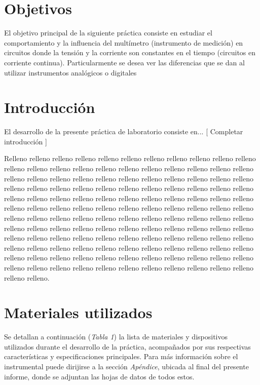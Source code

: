 \documentclass{article}
\begin{document}
\section{Objetivos}

	El objetivo principal de la siguiente práctica consiste en estudiar el comportamiento y la influencia del multímetro (instrumento de medición) en circuitos donde la tensión y la corriente son constantes en el tiempo (circuitos en corriente continua). Particularmente se desea ver las diferencias que se dan al utilizar instrumentos analógicos o digitales




\section{Introducción}

	El desarrollo de la presente práctica de laboratorio consiste en... [ Completar introducción ]
	\par
	Relleno relleno relleno relleno relleno relleno relleno relleno relleno relleno relleno relleno relleno relleno relleno relleno relleno relleno relleno relleno relleno relleno relleno relleno relleno relleno relleno relleno relleno relleno relleno relleno relleno relleno relleno relleno relleno relleno relleno relleno relleno relleno relleno relleno relleno relleno relleno relleno relleno relleno relleno relleno relleno relleno relleno relleno relleno relleno relleno relleno relleno relleno relleno relleno relleno relleno relleno relleno relleno relleno relleno relleno relleno relleno relleno relleno relleno relleno relleno relleno relleno relleno relleno relleno relleno relleno relleno relleno relleno relleno relleno relleno relleno relleno relleno relleno relleno relleno relleno relleno relleno relleno relleno relleno relleno relleno relleno relleno relleno relleno relleno relleno relleno relleno relleno relleno relleno relleno relleno relleno relleno relleno relleno relleno relleno relleno relleno relleno relleno relleno relleno relleno relleno relleno.

\bigskip\bigskip


\section{Materiales utilizados}

	Se detallan a continuación (\textit{Tabla 1}) la lista de materiales y dispositivos utilizados durante el desarrollo de la práctica, acompañados por sus respectivas características y especificaciones principales. Para más información sobre el instrumental puede dirijirse a la sección \textit{Apéndice}, ubicada al final del presente informe, donde se adjuntan las hojas de datos de todos estos.
\bigskip\bigskip
\end{document}
